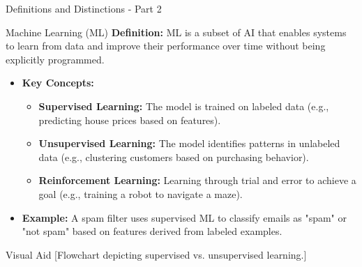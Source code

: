 \documentclass[aspectratio=169]{beamer}
\begin{document}
\begin{frame}[fragile]{Definitions and Distinctions - Part 2}
    \begin{block}{Machine Learning (ML)}
        \textbf{Definition:} ML is a subset of AI that enables systems to learn from data and improve their performance over time without being explicitly programmed.
    \end{block}

    \begin{itemize}
        \item \textbf{Key Concepts:}
        \begin{itemize}
            \item \textbf{Supervised Learning:} The model is trained on labeled data (e.g., predicting house prices based on features).
            \item \textbf{Unsupervised Learning:} The model identifies patterns in unlabeled data (e.g., clustering customers based on purchasing behavior).
            \item \textbf{Reinforcement Learning:} Learning through trial and error to achieve a goal (e.g., training a robot to navigate a maze).
        \end{itemize}

        \item \textbf{Example:} A spam filter uses supervised ML to classify emails as "spam" or "not spam" based on features derived from labeled examples.
    \end{itemize}

    \begin{block}{Visual Aid}
        [Flowchart depicting supervised vs. unsupervised learning.]
    \end{block}
\end{frame}
\end{document}
